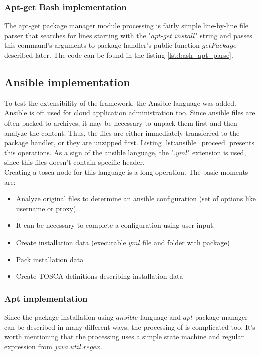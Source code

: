 \subsubsection*{Apt-get Bash implementation}
The apt-get package manager module processing is fairly simple line-by-line file parser that searches for lines starting with the "$apt$-$get$ $install$" string and passes this command's arguments to package handler's public function $getPackage$ described later. 
The code can be found in the listing \ref{lst:bash_apt_parse}.
\subsection*{Ansible implementation}
To test the extensibility of the framework, the Ansible language was added.
Ansible is oft used for cloud application administration too.
Since ansible files are often packed to archives, it may be necessary to unpack them first and  then analyze the content.
Thus, the files are either immediately transferred to the package handler, or they are unzipped first.
Listing \ref{lst:ansible_proceed} presents this operations.
As a sign of the ansible language, the ".$yml$" extension is used, since this files doesn't contain specific header.\\
Creating a \gls{tosca} node for this language is a long operation. 
The basic moments are:
\begin{itemize}
	\item Analyze original files to determine an ansible configuration (set of options like username or proxy).
	\item It can be necessary to complete a configuration using user input.
	\item Create installation data (executable $yml$ file and folder with package)
	\item Pack installation data
	\item Create TOSCA definitions describing installation data
\end{itemize} 

\subsubsection*{Apt implementation}
Since the package installation using $ansible$ language and $apt$ package manager can be described in many different ways, the processing of is complicated too.
It's worth mentioning that the processing uses a simple state machine and regular expression from $java$.$util$.$regex$.


